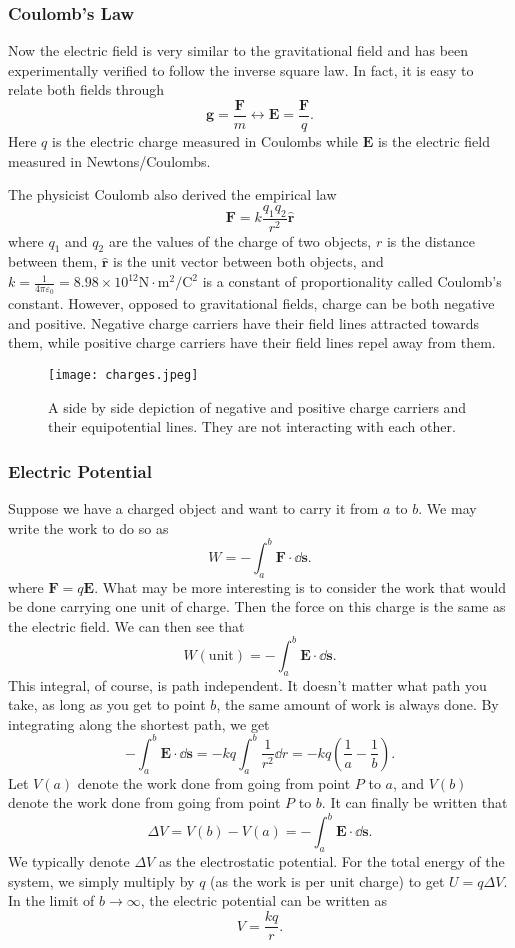 \documentclass[12pt]{article}
\let\vec\mathbf
\begin{document}
  \subsubsection{Coulomb's Law}
  \begin{idea}
  Now the electric field is very similar to the gravitational field and has been experimentally verified to follow the inverse square law. In fact, it is easy to relate both fields through 
  \[\vec g = \frac{\vec F}{m} \longleftrightarrow \vec E = \frac{\vec F}{q}.\]
  Here $q$ is the electric charge measured in Coulombs while $\vec E$ is the electric field measured in Newtons/Coulombs. 
  \end{idea}
  The physicist Coulomb also derived the empirical law
  \[\textbf{F}= k \frac{q_1 q_2}{r^2}\hat{\mathbf{r}}\]
  where $q_1$ and $q_2$ are the values of the charge of two objects, $r$ is the distance between them, $\hat{\mathbf{r}}$ is the unit vector between both objects, and $k = \frac{1}{4\pi \varepsilon_0} = 8.98\times 10^{12}\mathrm{N\cdot m^2/C^2}$ is a constant of proportionality called Coulomb's constant. However, opposed to gravitational fields, charge can be both negative and positive. Negative charge carriers have their field lines attracted towards them, while positive charge carriers have their field lines repel away from them. 
              \begin{figure}[H]
  \centering
      \texttt{[image: charges.jpeg]}
      \caption{A side by side depiction of negative and positive charge carriers and their equipotential lines. They are not interacting with each other. }
  \end{figure}
  \subsubsection{Electric Potential}
  Suppose we have a charged object and want to carry it from $a$ to $b$. We may write the work to do so as 
  \[W = -\int_{a}^{b} \vec F \cdot \dd \vec s.\]
  where $\vec F = q\vec E$. What may be more interesting is to consider the work that would be done carrying one unit of charge. Then the force on this charge is the same as the electric field. We can then see that 
  \[W(\text{unit}) = -\int_{a}^{b} \vec E \cdot \dd \vec s.\]
  This integral, of course, is path independent. It doesn't matter what path you take, as long as you get to point $b$, the same amount of work is always done. By integrating along the shortest path, we get 
  \[-\int_{a}^{b} \vec E \cdot \dd \vec s = -kq\int_{a}^{b}\frac{1}{r^2}\dd r = -kq \left(\frac{1}{a} - \frac{1}{b}\right).\]
  Let $V(a)$ denote the work done from going from point $P$ to $a$, and $V(b)$ denote the work done from going from point $P$ to $b$. It can finally be written that 
  \[\Delta V = V(b) - V(a) = -\int_{a}^{b} \vec E \cdot \dd \vec s.\]
  We typically denote $\Delta V$ as the electrostatic potential. For the total energy of the system, we simply multiply by $q$ (as the work is per unit charge) to get $U = q \Delta V$. In the limit of $b\to \infty$, the electric potential can be written as 
  \[V = \frac{kq}{r}.\]
\end{document}
